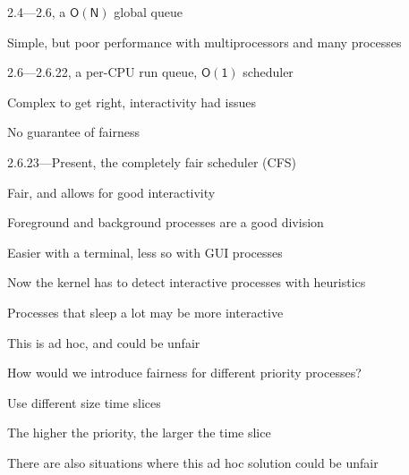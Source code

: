   \begin{slide}


    2.4---2.6, a $\mathsf{O(N)}$ global queue

    \leftspace{}Simple, but poor performance with multiprocessors and many processes
    \medskip

    2.6---2.6.22, a per-CPU run queue, $\mathsf{O(1)}$ scheduler

    \leftspace{}Complex to get right, interactivity had issues

    \leftspace{}No guarantee of fairness
    \medskip

    2.6.23---Present, the completely fair scheduler (CFS)

    \leftspace{}Fair, and allows for good interactivity

  \end{slide}

  \begin{slide}


    Foreground and background processes are a good division

    \leftspace{}Easier with a terminal, less so with GUI processes
    \medskip

    Now the kernel has to detect interactive processes with heuristics

    \leftspace{}Processes that sleep a lot may be more interactive

    \leftspace{}\leftspace{}This is ad hoc, and could be unfair
    \medskip

    How would we introduce fairness for different priority processes?

    \leftspace{}Use different size time slices

    \leftspace{}The higher the priority, the larger the time slice

    \leftspace{}\leftspace{}There are also situations where this ad hoc solution
    could be unfair

  \end{slide}

